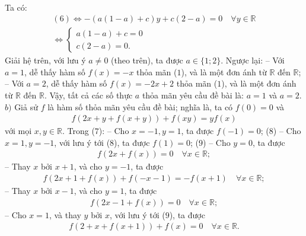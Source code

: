 \begin{multicols}{2}
\begin{align*}
	\end{align*}
	Ta có:
	\begin{align*}
		(6) \Leftrightarrow  - \left( {a\left( {1 - a} \right) + c} \right)y + c\left( {2 - a} \right) = 0 \quad \forall y \in \mathbb{R}\\
		\Leftrightarrow \begin{cases}
			a(1-a) + c = 0\\
			c(2-a) = 0.
		\end{cases}
	\end{align*}  
	Giải hệ trên, với lưu ý $a \ne 0$ (theo trên), ta được $a \in \{1; 2\}$.
	\vskip 0.05cm
	Ngược lại:
	-- Với $a = 1$, dễ thấy hàm số $f(x) = -x$ thỏa mãn ($1$), và là một đơn ánh từ  $\mathbb{R}$ đến  $\mathbb{R}$;
	\vskip 0.05cm
	-- Với $a = 2$, dễ thấy hàm số  $f(x) = -2x + 2$ thỏa mãn ($1$), và là một đơn ánh từ $\mathbb{R}$ đến $\mathbb{R}$.
	\vskip 0.05cm
	Vậy, tất cả các số thực $a$ thỏa mãn yêu cầu đề bài là: $a = 1$ và $a = 2$.
	\vskip 0.05cm
	$b)$ Giả sử $f$ là hàm số thỏa mãn yêu cầu đề bài; nghĩa là, ta có $f(0) = 0$ và
	\begin{align*}
		f\left( {2x + y + f\left( {x + y} \right)} \right) + f\left( {xy} \right) = yf\left( x \right) \tag{$7$}
	\end{align*}
	với mọi $x,y \in \mathbb{R}$.
	\vskip 0.05cm
	Trong ($7$):
	\vskip 0.05cm
	-- Cho $x = -1, y = 1$, ta được $f(-1) = 0$; \hfill ($8$)
	\vskip 0.05cm
	-- Cho $x = 1, y = -1$, với lưu ý tới ($8$), ta được  $f(1) = 0 $; \hfill ($9$)
	\vskip 0.05cm
	-- Cho $y = 0$, ta được
	\begin{align*}
		f\left( {2x + f\left( x \right)} \right) = 0 \quad \forall x \in \mathbb{R}; \tag{$10$}
	\end{align*}
	-- Thay $x$ bởi $x + 1$, và cho $y = -1$, ta được
	\begin{align*}
		f\left( {2x + 1 + f\left( x \right)} \right) + f\left( { - x - 1} \right) =  - f\left( {x + 1} \right) \quad\forall x \in \mathbb{R}; \tag{$11$}
	\end{align*}
	-- Thay $x$ bởi $x - 1$, và cho $y = 1$, ta được
	\begin{align*}
		f\left( {2x - 1 + f\left( x \right)} \right) = 0 \quad\forall x \in \mathbb{R}; \tag{$12$}
	\end{align*}
	-- Cho $x = 1$, và thay $y$ bởi $x$, với lưu ý tới ($9$), ta được
	\begin{align*}
		f\left( {2 + x + f\left( {x + 1} \right)} \right) + f\left( x \right) = 0 \quad\forall x \in \mathbb{R}. \tag{$13$}
	\end{align*}

\end{multicols}
